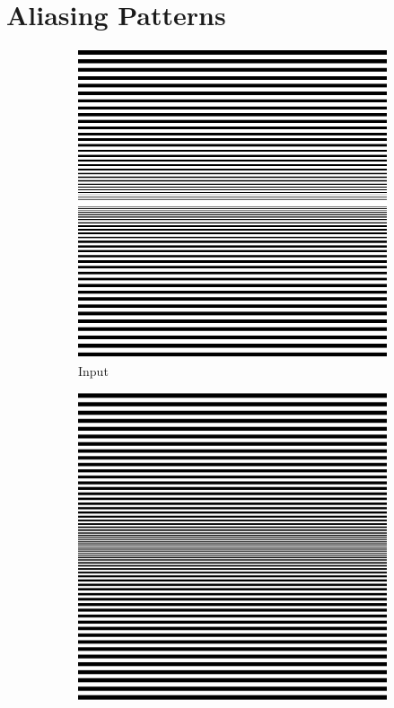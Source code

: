 \documentclass[12pt,a4paper]{article}
\begin{document}
    \section*{Aliasing Patterns}
        \begin{figure}[H]
            \centering
            \begin{subfigure}{0.2\textwidth}
                \includegraphics[width=\textwidth]{images/samples/aliasing-1-input.png}
                \caption*{Input}
            \end{subfigure}
            \enspace
            \begin{subfigure}{0.2\textwidth}
                \includegraphics[width=\textwidth]{images/samples/aliasing-1-orig.png}

\end{subfigure}
\end{figure}
\end{document}
